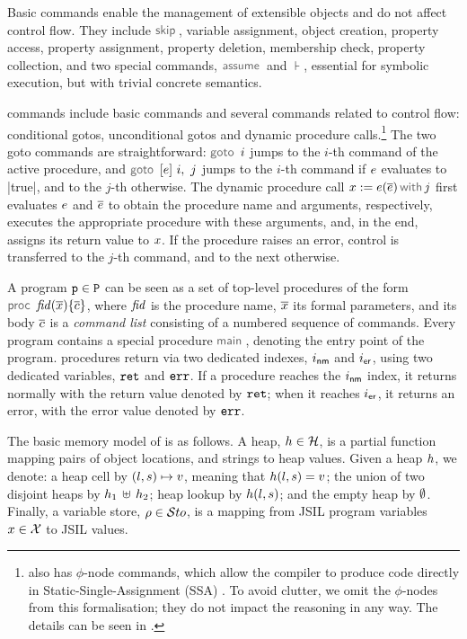 Basic \jsil commands enable the management of extensible objects and do not affect control flow. 
They include $\jsilskip$, variable assignment, object creation, property access, property assignment, property deletion, membership check, property collection, and two special commands, $\assume$ and $\assert$, essential for symbolic execution, but with trivial concrete semantics.

\jsil commands include basic \jsil commands and several commands related to control flow: conditional gotos, unconditional gotos and dynamic procedure calls.\footnote{\jsil also has $\phi$-node commands, which allow the \JSComp compiler to produce code directly in Static-Single-Assignment (SSA) \cite{SSA}. To avoid clutter, we omit the $\phi$-nodes from this formalisation; they do not impact the reasoning in any way. The details can be seen in \cite{javert}.} 
The two goto commands are straightforward: $\goto \ i$ jumps to the $i$-th command of the active procedure, and $\ifgoto{\jsilexpr}{i}{j}$ jumps to the $i$-th command if $e$ evaluates to \jsinline|true|, and to the $j$-th otherwise. 
The dynamic procedure call $\jsilcall{\jvar}{\jsilexpr}{\jvec{\jsilexpr}}{j}$ first evaluates  $e$ and $\overline{e}$ to obtain the procedure name and arguments, respectively, executes the appropriate procedure with these arguments, and, in the end, assigns its return value to $x$.
If the procedure raises an error, control is transferred to the $j$-th command, and to the next otherwise. 

A \jsil program $\mathtt{p} \in \mathtt{P}$ can be seen as a set of top-level procedures of the form $\procedure{\fid}{\jvec{\jvar}}{\jvec{\jcmd}}$, where $\mathit{fid}$ is the procedure name, $\overline{x}$ its formal parameters, and its body ${\overline{c}}$  is a \emph{command list} consisting of a numbered sequence of \jsil commands.
Every \jsil program contains a special procedure $\jsilmain$, denoting the entry point of the program. 
\jsil procedures return via two dedicated indexes, $i_{{\sf nm}}$ and $i_{{\sf er}}$, using two dedicated variables, $\mathtt{ret}$ and $\mathtt{err}$. If a procedure reaches the $i_{{\sf nm}}$ index, it returns normally with the return value denoted by $\mathtt{ret}$; when it reaches $i_{{\sf er}}$, it returns an error, with the error value denoted by $\mathtt{err}$.

The basic memory model of \jsil is as follows. 
A \jsil heap, $h \in {\mathcal H}$, is a partial function mapping pairs of  object locations, and strings to heap values. 
 Given a heap $h$, we denote: a heap cell by $(l, s) \mapsto v$, meaning that  $h(l,s) = v$; the union of two disjoint heaps by $h_1 \, \uplus \, h_2$; heap lookup by $h(l, s)$; and the empty heap by $\emptyset$.
 Finally, a \jsil variable store, $\rho \in \mathcal{S}to$, is a mapping from JSIL program variables $x \in \mathcal{X}$ to JSIL values.

